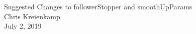 \documentclass[12pt, letterpaper]{article}
\begin{document}

\makeatletter
\renewcommand\paragraph{%
    \@startsection{paragraph}{4}{\z@}%
    {-3.25ex\@plus -1ex \@minus -.2ex}%
    {0.01em}%
    {\normalfont\normalsize\bfseries}}
\makeatother



\begin{center}
{\Large Suggested Changes to followerStopper and smoothUpParams} \\
{Chris Kreienkamp}\\
July 2, 2019
\end{center}

\end{document}
